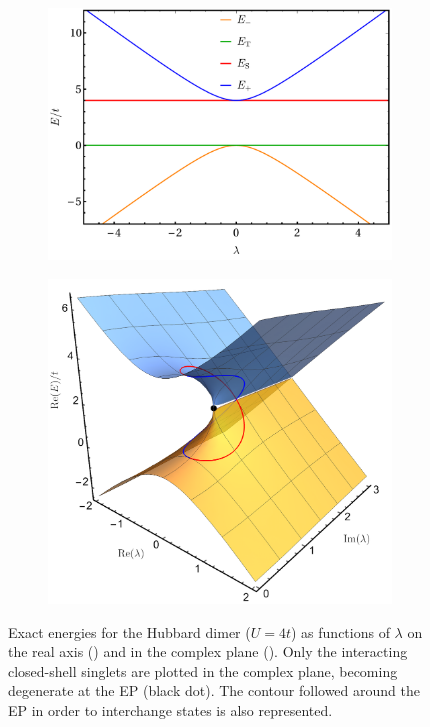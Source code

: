 \documentclass[aps,prb,reprint,noshowkeys,superscriptaddress]{revtex4-1}
\begin{document}
\begin{figure}[t]
	\begin{subfigure}{0.49\textwidth}
	\includegraphics[height=0.65\textwidth]{fig1a}
	\subcaption{\label{subfig:FCI_real}}
    \end{subfigure}
	\begin{subfigure}{0.49\textwidth}
	\includegraphics[height=0.65\textwidth]{fig1b}
	\subcaption{\label{subfig:FCI_cplx}}
    \end{subfigure}
	\caption{%
	Exact energies for the Hubbard dimer ($U=4t$) as functions of $\lambda$ on the real axis () and in the complex plane ().
    Only the interacting closed-shell singlets are plotted in the complex plane, becoming degenerate at the EP (black dot).
    The contour followed around the EP in order to interchange states is also represented.
	\label{fig:FCI}}
\end{figure}
\end{document}
